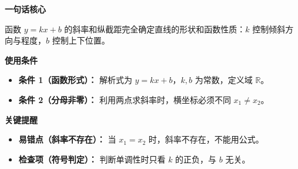\begin{summarybox}
	\textbf{\textcolor{CSummary}{一句话核心}}

	函数 $y=kx+b$ 的斜率和纵截距完全确定直线的形状和函数性质：$k$ 控制倾斜方向与程度，$b$ 控制上下位置。

	\medskip
	\textbf{\textcolor{CSummary}{使用条件}}
	\begin{itemize}[leftmargin=*, itemsep=0.5em, topsep=0.4em]
		\item \textbf{条件 1（函数形式）：} 解析式为 $y = kx + b$，$k,b$ 为常数，定义域 $\mathbb{R}$。
		\item \textbf{条件 2（分母非零）：} 利用两点求斜率时，横坐标必须不同 $x_1 \neq x_2$。
	\end{itemize}

	\medskip
	\textbf{\textcolor{CSummary}{关键提醒}}
	\begin{itemize}[leftmargin=*, itemsep=0.5em, topsep=0.4em]
		\item \textbf{易错点（斜率不存在）：} 当 $x_1 = x_2$ 时，斜率不存在，不能用公式。
		\item \textbf{检查项（符号判定）：} 判断单调性时只看 $k$ 的正负，与 $b$ 无关。
	\end{itemize}
\end{summarybox}
